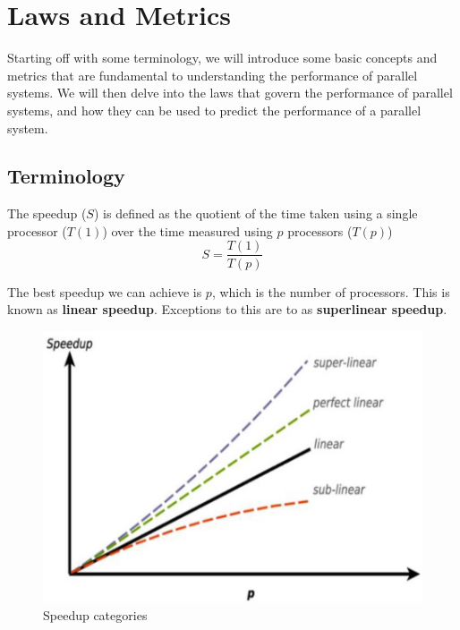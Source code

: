 \chapter{Laws and Metrics}
\label{ch:laws_and_metrics}

Starting off with some terminology, we will introduce some basic concepts and metrics that are fundamental to understanding the performance of parallel systems. We will then delve into the laws that govern the performance of parallel systems, and how they can be used to predict the performance of a parallel system.

\section{Terminology}

\begin{paracol}{2}
   \begin{definition}
      [Speedup]
      The speedup ($S$) is defined as the quotient of the time taken using a single processor ($T (1)$) over the time measured using $p$ processors ($T (p)$)
      \begin{equation}
         S = \frac{T(1)}{T(p)}
      \end{equation}
   \end{definition}
   
   The best speedup we can achieve is $p$, which is the number of processors. This is known as \textbf{linear speedup}.
   Exceptions to this are to as \textbf{superlinear speedup}.
   \switchcolumn

   \begin{figure}[htbp]
      \centering
      \includegraphics{images/06/speedup.png}
      \caption{Speedup categories}
      \label{fig:06/speedup}
   \end{figure}

\end{paracol}

